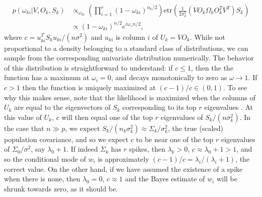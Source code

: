 \documentclass[12pt]{article}
\newcommand{\bl}[1]{{\mathbf #1}}
\newcommand{\etr}{\text{etr}}
\begin{document}
\begin{align}
p(\omega_{ki}|V, O_k, S_k) &\propto_{\omega_{ki}}
  \left(\prod_{i=1}^r(1-\omega_{ki})^{n_k/2}  \right)
  \etr(\frac{1}{2\sigma_k^2}(VO_k\Omega_kO_k^TV^T)S_k) \\
&  \propto  (1-\omega_{ki})^{n/2} e^{c \omega_s  n/2},    
\label{eqn:wpost}
\end{align}
%
\noindent where $c = u_{ki}^T S_k u_{ki}/(n \sigma^2)$ and $ u_{ki}$ is
column $i$ of $U_k = VO_k$.  While not proportional to a density
belonging to a standard class of distributions, we can sample from the
corresponding univariate distribution numerically.  The behavior of
this distribution is straightforward to understand: if $c\leq 1$, then
the the function has a maximum at $\omega_i =0$, and decays
monotonically to zero as $\omega \rightarrow 1$.  If $c>1$ then the
function is uniquely maximized at $(c-1)/c \in (0,1)$.  To see why
this makes sense, note that the likelihood is maximized when the
columns of $ U_k$ are equal to the eigenvectors of $S_k$
corresponding to its top $r$ eigenvalues
\citep{Tipping1999}. At this value of $U_k$, $c$ will then
equal one of the top $r$ eigenvalues of $ S_k/(n\sigma_k^2)$.  In the
case that $n\gg p$, we expect
$ S_k/(n_k\sigma_k^2)\approx \Sigma_k/\sigma_k^2$, the true (scaled)
population covariance, and so we expect $c$ to be near one of the top
$r$ eigenvalues of $\Sigma_0/\sigma^2$, say $\lambda_0+1$.  If indeed
$\Sigma_k$ has $r$ spikes, then $\lambda_k>0$,
$c \approx \lambda_0 +1 > 1$, and so the conditional mode of $w_i$ is
approximately $(c-1)/c = \lambda_i/(\lambda_i+1)$, the correct value.
On the other hand, if we have assumed the existence of a spike when
there is none, then $\lambda_0=0$, $c\approx 1$ and the Bayes estimate
of $w_i$ will be shrunk towards zero, as it should be.





\end{document}
